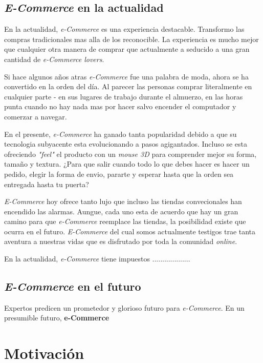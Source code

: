 \subsection{\textit{E-Commerce} en la actualidad}

En la actualidad, \textit{e-Commerce} es una experiencia destacable. Transformo las compras tradicionales mas alla de los reconocible. La experiencia es mucho mejor que cualquier otra manera de comprar que actualmente a seducido a una gran cantidad de \textit{e-Commerce lovers}.

Si hace algunos años atras \textit{e-Commerce} fue una palabra de moda, ahora se ha convertido en la orden del día. Al parecer las personas comprar literalmente en cualquier parte - en sus lugares de trabajo durante el almuerzo, en las horas punta cuando no hay nada mas por hacer salvo encender el computador y comerzar a navegar.

En el presente, \textit{e-Commerce} ha ganado tanta popularidad debido a que su tecnologia subyacente esta evolucionando a pasos agigantados. Incluso se esta ofreciendo \textit{"feel"} el producto con un \textit{mouse 3D} para comprender mejor su forma, tamaño y textura. ¿Para que salir cuando todo lo que debes hacer es hacer un pedido, elegir la forma de envio, pararte y esperar hasta que la orden sea entregada hasta tu puerta?

\textit{E-Commerce} hoy ofrece tanto lujo que incluso las tiendas convecionales han encendido las alarmas. Aungue, cada uno esta de acuerdo que hay un gran camino para que \textit{e-Commerce} reemplace las tiendas, la posibilidad existe que ocurra en el futuro. \textit{E-Commerce} del cual somos actualmente testigos trae tanta aventura a nuestras vidas que es disfrutado por toda la comunidad \textit{online}.

En la actualidad, \textit{e-Commerce} tiene impuestos ...................

\subsection{\textit{E-Commerce} en el futuro}


Expertos predicen un prometedor y glorioso futuro para \textit{e-Commerce}. En un presumible futuro, \textbf{e-Commerce} 


\section{Motivación}\label{cap:intro:motivacion}

